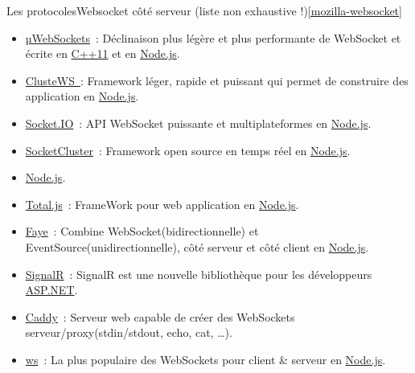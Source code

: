 \documentclass{beamer}
\begin{document}
    \begin{frame}{Les protocoles}{Websocket côté serveur (liste non exhaustive !)\cref{mozilla-websocket}}
        \begin{scriptsize}
            \begin{itemize}

                \item \href{https://github.com/uWebSockets/uWebSockets}{µWebSockets}~: Déclinaison plus légère et plus performante de WebSocket et écrite en \href{https://isocpp.org/}{C++11} et en \href{https://nodejs.org/fr/}{Node.js}.

                \item \href{https://github.com/ClusterWS/ClusterWS}{ClusteWS~}: Framework léger, rapide et puissant qui permet de construire des application en \href{https://nodejs.org/fr/}{Node.js}.

                \item \href{http://socket.io}{Socket.IO}~: API WebSocket puissante et multiplateformes en \href{https://nodejs.org}{Node.js}.

                \item \href{https://socketcluster.io/\#!/}{SocketCluster}~: Framework open source en temps réel en \href{https://nodejs.org}{Node.js}.

                \item \href{https://nodejs.org}{Node.js}.

                \item \href{https://www.totaljs.com/}{Total.js}~: FrameWork pour web application en \href{https://nodejs.org}{Node.js}.

                \item \href{https://www.npmjs.com/package/faye-websocket}{Faye}~: Combine WebSocket(bidirectionnelle) et EventSource(unidirectionnelle), côté serveur et côté client en \href{https://nodejs.org}{Node.js}.

                \item \href{https://signalr.net/}{SignalR}~: SignalR est une nouvelle bibliothèque pour les développeurs \href{https://dotnet.microsoft.com/apps/aspnet}{ASP.NET}.

                \item \href{https://caddyserver.com/docs/websocket}{Caddy}~: Serveur web capable de créer des WebSockets serveur/proxy(stdin/stdout, echo, cat, \ldots).

                \item \href{https://github.com/websockets/ws}{ws}~: La plus populaire des WebSockets pour client \& serveur en \href{https://nodejs.org}{Node.js}.


\end{itemize}
\end{scriptsize}
\end{frame}
\end{document}
